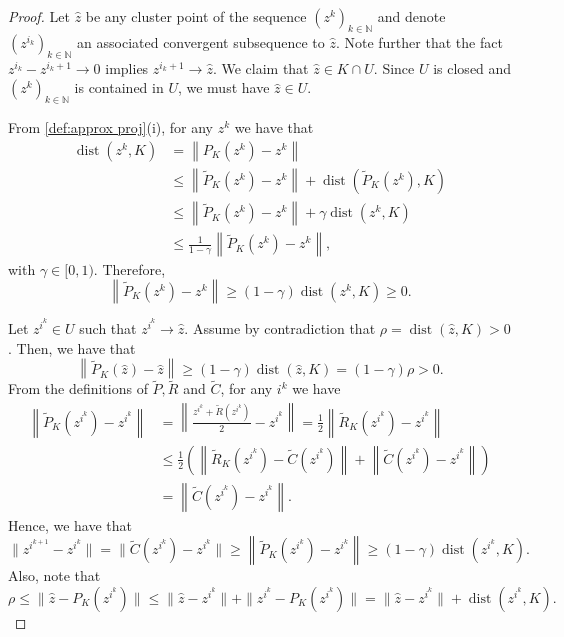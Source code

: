 \documentclass[smallextended,numbook,nospthms]{svjour3}
\theoremstyle{plain}
\theoremstyle{definition}
\def\NN{\mathds N}
\DeclareMathOperator{\dist}{dist}
\begin{document}
\begin{proof}
	Let $\hat{z}$ be any cluster point of the sequence $\left(z^{k}\right)_{k \in \NN}$ and denote $\left(z^{i_{k}}\right)_{k \in \NN}$ an associated convergent subsequence to $\hat{z}$. Note further that the fact $z^{i_{k}}-z^{i_{k}+1} \rightarrow 0$ implies $z^{i_{k}+1} \rightarrow \hat{z}$. We claim that $\hat{z} \in K \cap U$. Since $U$ is closed and $\left(z^{k}\right)_{k \in \NN}$ is contained in $U$, we must have $\hat{z} \in U$. 
	
	From \cref{def:approx proj}(i), for any $z^{k}$ we have that
	\begin{align}			
		\dist(z^{k},K)&=\left\|P_{K}(z^{k})-z^{k}\right\|\\
		&\leq\left\|\tilde{P}_{K}\left(z^{k}\right)-z^{k}\right\|+\dist\left(\tilde{P}_{K}\left(z^{k}\right),K\right)\\
		&\leq\left\|\tilde{P}_{K}\left(z^{k}\right)-z^{k}\right\|+\gamma\dist(z^{k},K) \\
		&\leq \frac{1}{1-\gamma}\left\|\tilde{P}_{K}\left(z^{k}\right)-z^{k}\right\|,
	\end{align}
	with $\gamma \in [0,1)$.
	Therefore, $$
	\left\|\tilde{P}_{K}\left(z^{k}\right)-z^{k}\right\| \geq (1-\gamma) \dist(z^{k},K)\geq 0.
	$$
	
	Let $z^{i^{k}} \in U$ such that $z^{i^{k}} \rightarrow \hat{z}$.
	Assume by contradiction that $\rho = \dist(\hat{z},K)>0$. Then, we have that 
	$$
	\left\|\tilde{P}_{K}\left(\hat{z}\right)-\hat{z}\right\| \geq (1-\gamma) \dist(\hat{z},K)=(1-\gamma)\rho >0.
	$$
	From the definitions of $\tilde{P}, \tilde{R}$ and $\tilde{C}$, for any $i^k$ we have
	\begin{align}
		\left\|\tilde{P}_{K}(z^{i^{k}})-z^{i^{k}}\right\|&=\left\|\frac{z^{i^{k}}+\tilde{R}(z^{i^{k}})}{2}-z^{i^{k}}\right\|=\frac{1}{2}\left\|\tilde{R}_{K}(z^{i^{k}})-z^{i^{k}}\right\|\\
		&\leq\frac{1}{2}\left(\left\|\tilde{R}_{K}(z^{i^{k}})-\tilde{C}(z^{i^{k}})\right\|+\left\|\tilde{C}(z^{i^{k}})-z^{i^{k}}\right\| \right)\\
		&=\left\|\tilde{C}(z^{i^{k}})-z^{i^{k}}\right\|.
	\end{align}
	 Hence, we have that
	 \begin{equation}\label{eq:CARM conv eq 2}	 		 \|z^{i^{k+1}}-z^{i^{k}}\|=\|\tilde{C}(z^{i^{k}})-z^{i^{k}}\| \geq \left\|\tilde{P}_{K}\left(z^{i^{k}}\right)-z^{i^{k}}\right\| \geq (1-\gamma) \dist(z^{i^{k}},K). 
	 \end{equation}
	Also, note that
	$$
	\rho \leq \|\hat{z}-P_{K}(z^{i^k})\| \leq \|\hat{z}-z^{i^{k}}\|+\|z^{i^{k}}-P_{K}(z^{i^{k}})\| =\|\hat{z}-z^{i^{k}}\|+\dist(z^{i^{k}},K).
	$$


\end{proof}
\end{document}
